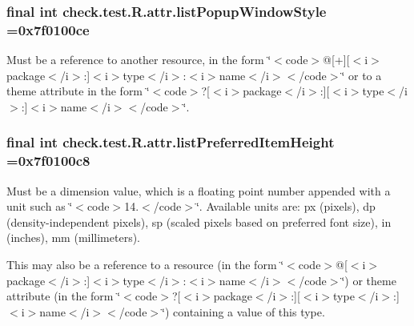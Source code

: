 \subsubsection[{list\+Popup\+Window\+Style}]{\setlength{\rightskip}{0pt plus 5cm}final int check.\+test.\+R.\+attr.\+list\+Popup\+Window\+Style =0x7f0100ce\hspace{0.3cm}{\ttfamily [static]}}\label{classcheck_1_1test_1_1_r_1_1attr_a41c863e947df5917e6718786a094a95d}
Must be a reference to another resource, in the form \char`\"{}$<$code$>$@\mbox{[}+\mbox{]}\mbox{[}$<$i$>$package$<$/i$>$\+:\mbox{]}$<$i$>$type$<$/i$>$\+:$<$i$>$name$<$/i$>$$<$/code$>$\char`\"{} or to a theme attribute in the form \char`\"{}$<$code$>$?\mbox{[}$<$i$>$package$<$/i$>$\+:\mbox{]}\mbox{[}$<$i$>$type$<$/i$>$\+:\mbox{]}$<$i$>$name$<$/i$>$$<$/code$>$\char`\"{}. \hypertarget{classcheck_1_1test_1_1_r_1_1attr_a52420e9bc7b9f17c46ea9db6ff438295}{}
\subsubsection[{list\+Preferred\+Item\+Height}]{\setlength{\rightskip}{0pt plus 5cm}final int check.\+test.\+R.\+attr.\+list\+Preferred\+Item\+Height =0x7f0100c8\hspace{0.3cm}{\ttfamily [static]}}\label{classcheck_1_1test_1_1_r_1_1attr_a52420e9bc7b9f17c46ea9db6ff438295}
Must be a dimension value, which is a floating point number appended with a unit such as \char`\"{}$<$code$>$14.\+5sp$<$/code$>$\char`\"{}. Available units are\+: px (pixels), dp (density-\/independent pixels), sp (scaled pixels based on preferred font size), in (inches), mm (millimeters). 

This may also be a reference to a resource (in the form \char`\"{}$<$code$>$@\mbox{[}$<$i$>$package$<$/i$>$\+:\mbox{]}$<$i$>$type$<$/i$>$\+:$<$i$>$name$<$/i$>$$<$/code$>$\char`\"{}) or theme attribute (in the form \char`\"{}$<$code$>$?\mbox{[}$<$i$>$package$<$/i$>$\+:\mbox{]}\mbox{[}$<$i$>$type$<$/i$>$\+:\mbox{]}$<$i$>$name$<$/i$>$$<$/code$>$\char`\"{}) containing a value of this type. \hypertarget{classcheck_1_1test_1_1_r_1_1attr_aabce9b732bbded79dc2e9a7fe1c57972}{}
